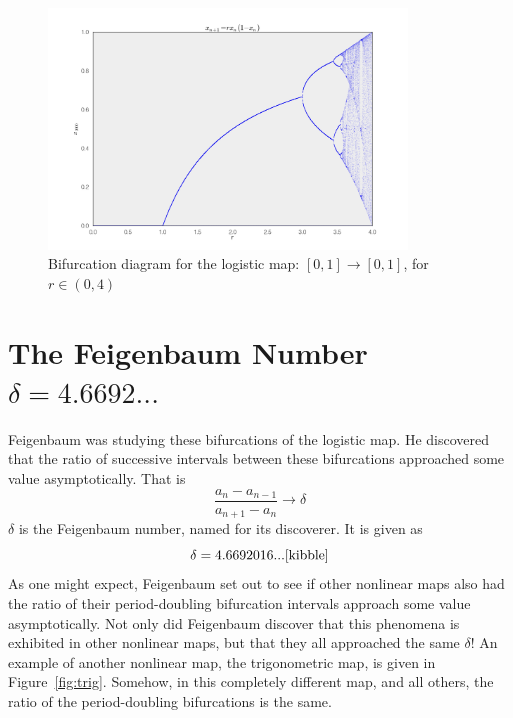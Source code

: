 \documentclass[paper=a4, fontsize=11pt, abstract=on]{scrartcl} %
\numberwithin{equation}{section}
\numberwithin{figure}{section}
\numberwithin{table}{section}
\begin{document}
\pagebreak

\begin{figure}[h]
  \centering
  \includegraphics[width=0.85\textwidth]{logmap}
  \caption{Bifurcation diagram for the logistic map: $[0,1] \rightarrow [0,1]$, for $r \in (0, 4)$ }
  \label{fig:logmap}
\end{figure}


\section{The Feigenbaum Number $\delta=4.6692...$}
\label{sec:feig}

Feigenbaum was studying these bifurcations of the logistic map. He
discovered that the ratio of successive intervals between these
bifurcations approached some value asymptotically. That is
\begin{equation}
  \label{eq:feigen}
  \frac{a_n - a_{n-1}}{a_{n+1}-a_n} \rightarrow \delta
\end{equation}
$\delta$ is the Feigenbaum number, named for its discoverer. It is
given as 
$$
\delta = 4.6692016...\cite{kibble}
$$
As one might expect, Feigenbaum set out to see if other nonlinear maps
also had the ratio of their period-doubling bifurcation intervals
approach some value asymptotically. Not only did Feigenbaum discover
that this phenomena is exhibited in other nonlinear maps, but that
they all approached the same $\delta$\cite{feigenbaum}! An example of
another nonlinear map, the trigonometric map, is given in
Figure~\ref{fig:trig}. Somehow, in this completely different map, and
all others, the ratio of the period-doubling bifurcations is the same.
\end{document}
